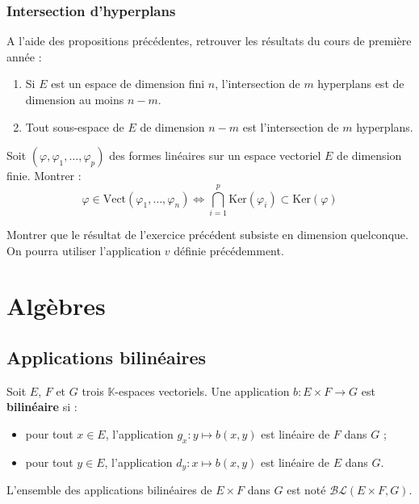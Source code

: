 \documentclass[french]{article}
\newcommand{\K}{\mathbb{K}}
\renewcommand{\ker}{\text{Ker}}
\newcommand{\Vect}{\text{Vect}}
\theoremstyle{plain}
\theoremstyle{definition}
\theoremstyle{remark}
\begin{document}
\subsubsection*{Intersection d'hyperplans}

A l'aide des propositions précédentes, retrouver les résultats du cours de première année :

\begin{prop}%
	\begin{enumerate}
		\item Si $E$ est un espace de dimension fini $n$, l'intersection de $m$ hyperplans est de dimension au moins $n-m$.
		\item Tout sous-espace de $E$ de dimension $n-m$ est l'intersection de $m$ hyperplans.
	\end{enumerate}
\end{prop}

\begin{exo}
	Soit $(\varphi,\varphi_1,\ldots,\varphi_p)$ des formes linéaires sur un espace vectoriel $E$ de dimension finie. Montrer : $$\varphi\in\Vect(\varphi_1,\ldots,\varphi_n)\iff\bigcap_{i=1}^p\ker(\varphi_i)\subset\ker(\varphi)$$
\end{exo}

\begin{exo}
	Montrer que le résultat de l'exercice précédent subsiste en dimension quelconque. On pourra utiliser l'application $v$ définie précédemment.
\end{exo}

\section{Algèbres}

\subsection{Applications bilinéaires}

\begin{dfn}
	Soit $E$, $F$ et $G$ trois $\K$-espaces vectoriels. Une application $b:E\times F\to G$ est \textbf{bilinéaire} si :
	\begin{itemize}
		\item pour tout $x\in E$, l'application $g_x:y\mapsto b(x,y)$ est linéaire de $F$ dans $G$ ;
		\item pour tout $y\in E$, l'application $d_y:x\mapsto b(x,y)$ est linéaire de $E$ dans $G$.
	\end{itemize}
	L'ensemble des applications bilinéaires de $E\times F$ dans $G$ est noté $\mathcal{BL}(E\times F, G)$.
\end{dfn}
\end{document}

